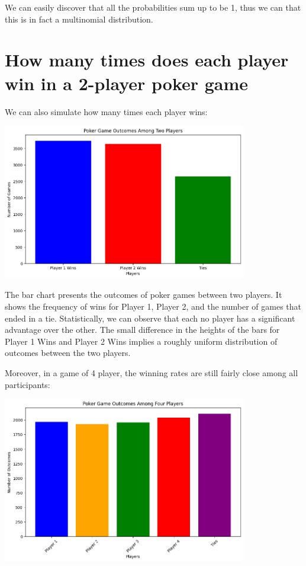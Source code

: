 \documentclass{article}
\begin{document}
We can easily discover that all the probabilities sum up to be 1, thus 
we can that this is in fact a multinomial distribution. 




\newpage
\section*{How many times does each player win in a 2-player poker game}

We can also simulate how many times each player wins:

\begin{center}
    \includegraphics[width = 0.8\textwidth]{images/win_rate_2_player.png}
\end{center}

The bar chart presents the outcomes of poker games between two players. 
It shows the frequency of wins for Player 1, Player 2, and the number 
of games that ended in a tie. Statistically, we can observe that each 
no player has a significant advantage over the other. The small difference 
in the heights of the bars for Player 1 Wins and Player 2 Wins implies 
a roughly uniform distribution of outcomes between the two players. 

Moreover, in a game of 4 player, the winning rates are still fairly close 
among all participants:

\begin{center}
    \includegraphics[width = 0.8\textwidth]{images/win_rate_4_player.png}
\end{center}
\end{document}
